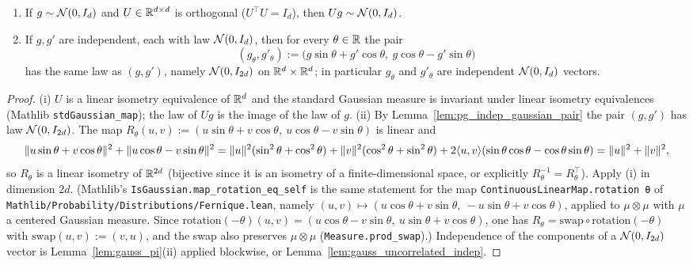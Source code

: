 \begin{lemma}\label{lem:gauss_rotation}
\begin{enumerate}
  \item[(i)] If $g \sim \mathcal{N}(0, I_d)$ and $U \in \mathbb{R}^{d\times d}$ is orthogonal
        ($U^\top U = I_d$), then $Ug \sim \mathcal{N}(0, I_d)$.
  \item[(ii)] If $g, g'$ are independent, each with law $\mathcal{N}(0, I_d)$, then for every
        $\theta \in \mathbb{R}$ the pair
        \[
          (g_\theta, g'_\theta) := \big(g\sin\theta + g'\cos\theta,\ g\cos\theta - g'\sin\theta\big)
        \]
        has the same law as $(g, g')$, namely $\mathcal{N}(0, I_{2d})$ on $\mathbb{R}^d \times \mathbb{R}^d$;
        in particular $g_\theta$ and $g'_\theta$ are independent $\mathcal{N}(0,I_d)$ vectors.
\end{enumerate}
\end{lemma}

\begin{proof}
(i) $U$ is a linear isometry equivalence of $\mathbb{R}^d$ and the standard Gaussian measure is
invariant under linear isometry equivalences (Mathlib \texttt{stdGaussian\_map}); the law of
$Ug$ is the image of the law of $g$. (ii) By Lemma~\ref{lem:pg_indep_gaussian_pair} the pair
$(g,g')$ has law $\mathcal{N}(0, I_{2d})$. The map
$R_\theta(u,v) := (u\sin\theta + v\cos\theta,\ u\cos\theta - v\sin\theta)$ is linear and
\[
  \lVert u\sin\theta + v\cos\theta \rVert^2 + \lVert u\cos\theta - v\sin\theta \rVert^2
  = \lVert u \rVert^2(\sin^2\theta + \cos^2\theta) + \lVert v \rVert^2(\cos^2\theta + \sin^2\theta)
    + 2\langle u, v \rangle(\sin\theta\cos\theta - \cos\theta\sin\theta) = \lVert u \rVert^2 + \lVert v \rVert^2,
\]
so $R_\theta$ is a linear isometry of $\mathbb{R}^{2d}$ (bijective since it is an isometry of a
finite-dimensional space, or explicitly $R_\theta^{-1} = R_\theta^\top$). Apply (i) in
dimension $2d$. (Mathlib's \texttt{IsGaussian.map\_rotation\_eq\_self} is the same statement
for the map \texttt{ContinuousLinearMap.rotation θ} of
\texttt{Mathlib/Probability/Distributions/Fernique.lean}, namely
$(u,v)\mapsto(u\cos\theta + v\sin\theta,\ -u\sin\theta + v\cos\theta)$, applied to
$\mu\otimes\mu$ with $\mu$ a centered Gaussian measure. Since
$\mathrm{rotation}(-\theta)(u,v) = (u\cos\theta - v\sin\theta,\ u\sin\theta + v\cos\theta)$,
one has $R_\theta = \mathrm{swap}\circ\mathrm{rotation}(-\theta)$ with
$\mathrm{swap}(u,v) := (v,u)$, and the swap also preserves $\mu\otimes\mu$
(\texttt{Measure.prod\_swap}).) Independence of the components of
a $\mathcal{N}(0,I_{2d})$ vector is Lemma~\ref{lem:gauss_pi}(ii) applied blockwise, or
Lemma~\ref{lem:gauss_uncorrelated_indep}.
\end{proof}


